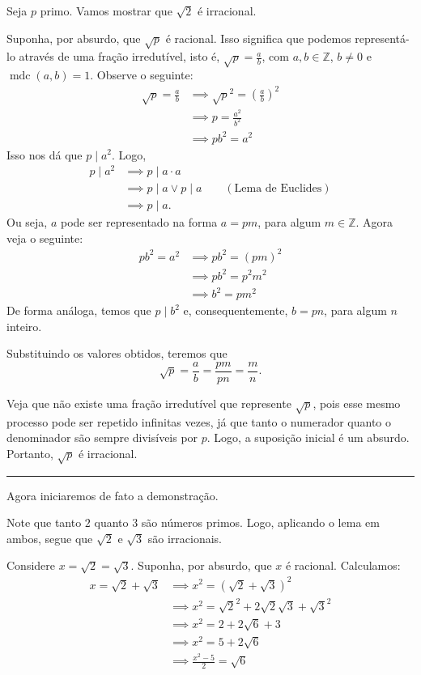 \documentclass[12pt]{article}
\DeclareMathOperator{\mdc}{mdc}
\newcommand{\customline}{\noindent\rule{\linewidth}{0.4pt}\par\vspace{1em}}
\begin{document}
	Seja $p$ primo. Vamos mostrar que $\sqrt{2}$ é irracional.
	
	Suponha, por absurdo, que $\sqrt{p}$ é racional. Isso significa que podemos representá-lo através de uma fração irredutível, isto é, $\sqrt{p} = \frac{a}{b}$, com $a, b \in \mathbb{Z}$, $b \neq 0$ e $\mdc(a,b) = 1$. Observe o seguinte:
	\begin{align*}
		\sqrt{p} = \frac{a}{b}
		&\implies \sqrt{p}^2 = \left(\frac{a}{b}\right)^2 \\
		&\implies p = \frac{a^2}{b^2} \\
		&\implies pb^2 = a^2
	\end{align*}
	Isso nos dá que $p \mid a^2$. Logo,
	\begin{align*}
		p \mid a^2
		&\implies p \mid a \cdot a \\
		&\implies p \mid a \lor p \mid a \qquad (\text{Lema de Euclides}) \\
		&\implies p \mid a.
	\end{align*}
	Ou seja, $a$ pode ser representado na forma $a = pm$, para algum $m \in \mathbb{Z}$. Agora veja o seguinte:
	\begin{align*}
		pb^2 = a^2
		&\implies pb^2 = (pm)^2 \\
		&\implies pb^2 = p^2m^2 \\
		&\implies b^2 = pm^2
	\end{align*}
	De forma análoga, temos que $p \mid b^2$ e, consequentemente, $b = pn$, para algum $n$ inteiro.
	
	Substituindo os valores obtidos, teremos que
	\[
	\sqrt{p} = \frac{a}{b} = \frac{pm}{pn} = \frac{m}{n}.
	\]
	
	Veja que não existe uma fração irredutível que represente $\sqrt{p}$, pois esse mesmo processo pode ser repetido infinitas vezes, já que tanto o numerador quanto o denominador são sempre divisíveis por $p$. Logo, a suposição inicial é um absurdo. Portanto, $\sqrt{p}$ é irracional. \blacksquare
	
	\customline
	
	Agora iniciaremos de fato a demonstração.
	
	Note que tanto $2$ quanto $3$ são números primos. Logo, aplicando o lema em ambos, segue que $\sqrt{2}$ e $\sqrt{3}$ são irracionais.
	
	Considere $x = \sqrt{2} = \sqrt{3}$. Suponha, por absurdo, que $x$ é racional. Calculamos:
	\begin{align*}
		x = \sqrt{2} + \sqrt{3}
		&\implies x^2 = (\sqrt{2} + \sqrt{3})^2 \\
		&\implies x^2 = \sqrt{2}^2 + 2\sqrt{2}\sqrt{3} + \sqrt{3}^2 \\
		&\implies x^2 = 2 + 2\sqrt{6} + 3 \\
		&\implies x^2 = 5 + 2\sqrt{6} \\
		&\implies \frac{x^2 - 5}{2} = \sqrt{6}
	\end{align*}
	
\end{document}

